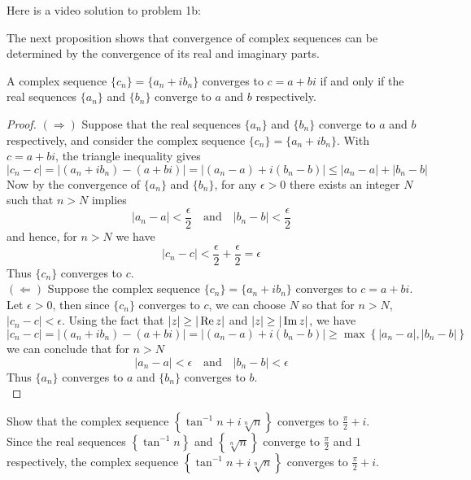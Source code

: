\documentclass[handout]{ximera}
\begin{document}
Here is a video solution to problem 1b:\\
\begin{foldable}
\end{foldable}




The next proposition shows that convergence of complex sequences can be determined by the convergence of its real and imaginary parts.

\begin{proposition}
A complex sequence $\{c_n\} = \{a_n + ib_n\}$ converges to $c = a+bi$ if and only if the real 
sequences $\{a_n\}$ and $\{b_n\}$ converge to $a$ and $b$ respectively.
\end{proposition}
\begin{proof}
$\left(\Rightarrow\right)$ Suppose that the real sequences $\{a_n\}$ and $\{b_n\}$ converge to $a$ and $b$ respectively, 
and consider the complex sequence $\{c_n\} = \{a_n + ib_n\}$. With $c = a+bi$, the triangle inequality gives
\[
|c_n - c| = |(a_n + ib_n) - (a+bi)| = |(a_n -a) + i(b_n -b)| \leq |a_n-a|+ |b_n -b|
\]
Now by the convergence of $\{a_n\}$ and $\{b_n\}$, for any $\epsilon >0$ there exists an integer $N$ such that $n>N$ implies
\[
|a_n-a| < \frac{\epsilon}{2} \quad \text{and} \quad  |b_n -b| < \frac{\epsilon}{2}
\]
and hence, for $n>N$ we have
\[
|c_n-c| < \frac{\epsilon}{2}+\frac{\epsilon}{2}= \epsilon 
\]
Thus $\{c_n\}$ converges to $c$.\\
$\left(\Leftarrow\right)$ \; Suppose the complex sequence $\{c_n\} = \{a_n + ib_n\}$ converges to $c = a+bi$.
Let $\epsilon >0$, then since $\{c_n\}$ converges to $c$, we can choose $N$ so that for $n>N$, $|c_n - c| < \epsilon$.
Using the fact that $|z| \geq |\operatorname{Re} z|$ and $|z| \geq |\operatorname{Im} z|$, we have 
\[
|c_n - c| = |(a_n + ib_n) - (a+bi)| = |(a_n -a) + i(b_n -b)| \geq \max\left\{|a_n-a|, |b_n -b|\right\}
\]
we can conclude that for $n>N$
\[
|a_n-a| < \epsilon \quad \text{and} \quad  |b_n -b| < \epsilon
\]
Thus $\{a_n\}$ converges to $a$ and $\{b_n\}$ converges to $b$.\\

\end{proof}

\begin{example}[example 2]
Show that the complex sequence $\displaystyle \left\{\tan^{-1} n + i\sqrt[n]n\right\}$ converges to $\displaystyle \frac{\pi}{2} + i$.\\
Since the real sequences $\displaystyle \left\{\tan^{-1} n\right\}$ and $\displaystyle \left\{\sqrt[n]n\right\}$ converge to 
$\displaystyle \frac{\pi}{2}$ and $1$ respectively, the complex sequence 
$\displaystyle \left\{\tan^{-1} n + i\sqrt[n]n\right\}$ converges to $\displaystyle \frac{\pi}{2} + i$.
\end{example}
\end{document}
